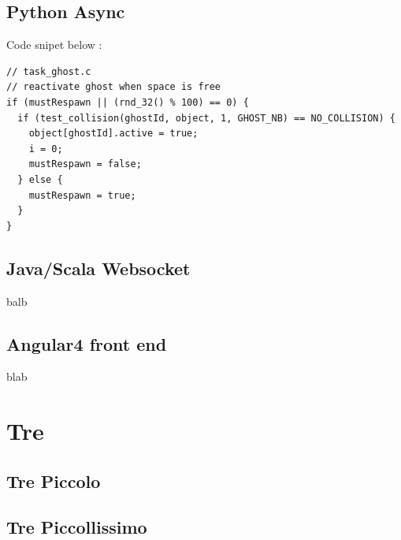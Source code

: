 \documentclass{article}
\begin{document}
\subsection{Python Async}

%
Code snipet below : 
\\
{
\begin{lstlisting}
// task_ghost.c
// reactivate ghost when space is free
if (mustRespawn || (rnd_32() % 100) == 0) {
  if (test_collision(ghostId, object, 1, GHOST_NB) == NO_COLLISION) {
    object[ghostId].active = true;
    i = 0;
    mustRespawn = false;
  } else {
	mustRespawn = true;
  }
}

\end{lstlisting}
}

\subsection{Java/Scala Websocket}

{balb}



\subsection{Angular4 front end}

{blab}

  
{\vspace*{1cm}} \section{Tre}

\subsection{Tre Piccolo}
%
%



\subsection{Tre Piccollissimo}
\end{document}
